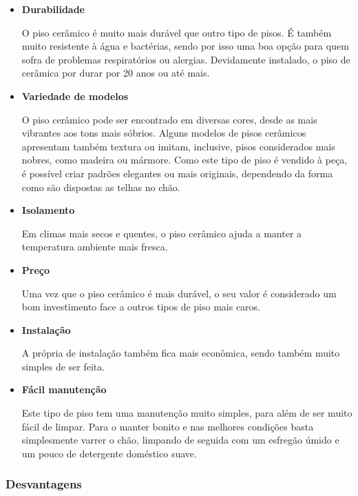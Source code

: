 	\begin{itemize}

		\item \textbf{Durabilidade}
		
		O piso cerâmico é muito mais durável que outro tipo de pisos. É também muito resistente à água e bactérias, sendo por isso uma boa opção para quem sofra de problemas respiratórios ou alergias. Devidamente instalado, o piso de cerâmica por durar por 20 anos ou até mais.

		\item \textbf{Variedade de modelos}
		
		O piso cerâmico pode ser encontrado em diversas cores, desde as mais vibrantes aos tons mais sóbrios. Alguns modelos de pisos cerâmicos apresentam também textura ou imitam, inclusive, pisos considerados mais nobres, como madeira ou mármore. Como este tipo de piso é vendido à peça, é possível criar padrões elegantes ou mais originais, dependendo da forma como são dispostas as telhas no chão.

		\item \textbf{Isolamento}
		
		Em climas mais secos e quentes, o piso cerâmico ajuda a manter a temperatura ambiente mais fresca.

		\item \textbf{Preço}
		
		Uma vez que o piso cerâmico é mais durável, o seu valor é considerado um bom investimento face a outros tipos de piso mais caros.

		\item \textbf{Instalação}
		
		A própria de instalação também fica mais econômica, sendo também muito simples de ser feita.

		\item \textbf{Fácil manutenção}
		
		Este tipo de piso tem uma manutenção muito simples, para além de ser muito fácil de limpar. Para o manter bonito e nas melhores condições basta simplesmente varrer o chão, limpando de seguida com um esfregão úmido e um pouco de detergente doméstico suave.

	\end{itemize}

\subsubsection*{\textbf{Desvantagens}}


